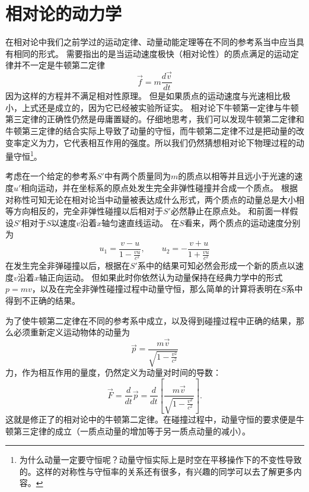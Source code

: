\section{相对论的动力学}
在相对论中我们之前学过的运动定律、动量动能定理等在不同的参考系当中应当具有相同的形式。
需要指出的是当运动速度极快（相对论性）的质点满足的运动定律并不一定是牛顿第二定律
\begin{equation}\label{eqn: 相对论，粒子的运动方程}
\vec{f}=m\frac{d\vec{v}}{dt}
\end{equation}
因为这样的方程并不满足相对性原理。
但是如果质点的运动速度与光速相比极小，上式还是成立的，因为它已经被实验所证实。
相对论下牛顿第一定律与牛顿第三定律的正确性仍然是毋庸置疑的。仔细地思考，我们可以发现牛顿第二定律和牛顿第三定律的结合实际上导致了动量的守恒，而牛顿第二定律不过是把动量的改变率定义为力，它代表相互作用的强度。所以我们仍然猜想相对论下物理过程的动量守恒\footnote{为什么动量一定要守恒呢？动量守恒实际上是时空在平移操作下的不变性导致的。这样的对称性与守恒率的关系还有很多，有兴趣的同学可以去了解更多内容。}。


考虑在一个给定的参考系$S'$中有两个质量同为$m$的质点以相等并且远小于光速的速度$u'$相向运动，并在坐标系的原点处发生完全非弹性碰撞并合成一个质点。
根据对称性可知无论在相对论当中动量被表达成什么形式，两个质点的动量总是大小相等方向相反的，完全非弹性碰撞以后相对于$S'$必然静止在原点处。
和前面一样假设$S'$相对于$S$以速度$v$沿着$x$轴匀速直线运动。
在$S$看来，两个质点的运动速度分别为
\begin{equation}
u_{1}=\frac{v-u}{1-\frac{vu}{c^2}},\qquad u_{2}=-\frac{v+u}{1+\frac{vu}{c^2}}
\end{equation}
在发生完全非弹碰撞以后，根据在$S'$系中的结果可知必然会形成一个新的质点以速度$v$沿着$x$轴正向运动。
但如果此时你依然认为动量保持在经典力学中的形式$p=mv$，以及在完全非弹性碰撞过程中动量守恒，那么简单的计算将表明在$S$系中得到不正确的结果。

为了使牛顿第二定律在不同的参考系中成立，以及得到碰撞过程中正确的结果，那么必须重新定义运动物体的动量为
\begin{equation}
\vec{p} = \frac{m\vec{v}}{\sqrt{1-\frac{v^2}{c^2}}}
\end{equation}
力，作为相互作用的量度，仍然定义为动量对时间的导数：
\begin{equation}\label{eqn: Newton.II}
\vec{F}=\frac{d}{dt}\vec{p} = \frac{d}{dt}\left[\frac{m\vec{v}}{\sqrt{1-\frac{v^2}{c^2}}}\right].
\end{equation}
这就是修正了的相对论中的牛顿第二定律。在碰撞过程中，动量守恒的要求便是牛顿第三定律的成立（一质点动量的增加等于另一质点动量的减小）。

